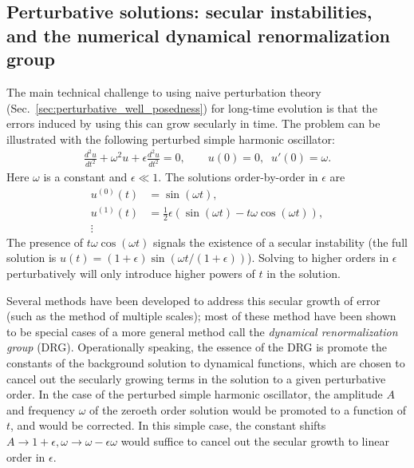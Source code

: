 \documentclass{ws-ijmpd}
\begin{document}
\subsection{Perturbative solutions: secular instabilities, 
and the numerical dynamical renormalization group
\label{sec:perturbative_secular_instabilities}
}
The main technical challenge to using naive perturbation theory
(Sec.~\ref{sec:perturbative_well_posedness})
for long-time evolution
is that the errors induced by using this
can grow secularly in time\cite{bender2013advanced}.
The problem can be illustrated with the following perturbed
simple harmonic oscillator:
\begin{align}
   \frac{d^2 u}{dt^2} + \omega^2 u + \epsilon \frac{d^2u}{dt^2}
   =
   0
   ,\qquad
   u(0) = 0
   ,\;\;
   u'(0) = \omega
   .
\end{align}
Here $\omega$ is a constant and $\epsilon\ll1$.
The solutions order-by-order in $\epsilon$ are
\begin{subequations}
\begin{align}
   u^{(0)}(t)
   &=
   \sin\left(\omega t\right)
   ,\\
   u^{(1)}(t)
   &=
   \frac{1}{2}\epsilon\left(
      \sin\left(\omega t\right)
      -
      t\omega\cos\left(\omega t\right)
   \right)
   ,\\
   \vdots\nonumber
\end{align}
\end{subequations}
The presence of $t\omega \cos\left(\omega t\right)$ signals
the existence of a secular instability (the full
solution is $u(t) = \left(1+\epsilon\right)
\sin\left(\omega t/\left(1+\epsilon\right)\right)$).
Solving to higher orders in $\epsilon$ perturbatively will only
introduce higher powers of $t$ in the solution.

Several methods have been developed to address this secular growth of
error (such as the method of multiple 
scales\cite{bender2013advanced,kevorkian2012multiple}); 
most of these method have been shown to be special cases
of a more general method call
the \emph{dynamical renormalization group} (DRG)\cite{Chen:1995ena,
Kunihiro:1995zt,10.1143/PTPS.99.244,Ei:1999pk}.
Operationally speaking, the essence of the DRG is promote
the constants of the background solution to dynamical functions,
which are chosen to cancel out the secularly growing terms
in the solution to a given perturbative order.
In the case of the perturbed simple harmonic oscillator,
the amplitude $A$ and frequency $\omega$ of the zeroeth order solution 
would be promoted to a function of $t$, and would be corrected. 
In this simple case, the constant shifts 
$A\to1 + \epsilon, \omega \to \omega - \epsilon\omega $ would suffice
to cancel out the secular growth to linear order in $\epsilon$.
\end{document}
